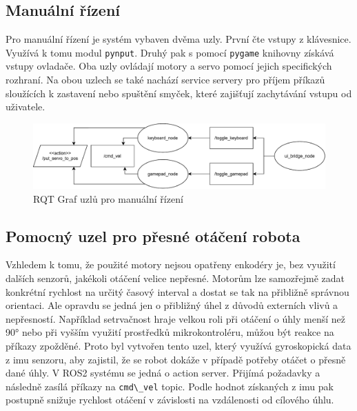\subsection*{Manuální řízení}
Pro manuální řízení je systém vybaven dvěma uzly. První čte vstupy z klávesnice. Využívá k tomu modul \verb|pynput|. Druhý pak s pomocí \verb|pygame| knihovny získává vstupy ovladače. Oba uzly ovládají motory a servo pomocí jejich specifických rozhraní. Na obou uzlech se také nachází service servery pro příjem příkazů sloužících k zastavení nebo spuštění smyček, které zajišťují zachytávání vstupu od uživatele.

\begin{figure}[h!]
	\centering
	\includegraphics[scale=0.75]{obrazky-figures/manual_control_diagram.pdf}
	\caption{RQT Graf uzlů pro manuální řízení}
	\label{}
\end{figure}

\subsection*{Pomocný uzel pro přesné otáčení robota}
Vzhledem k tomu, že použité motory nejsou opatřeny enkodéry je, bez využití dalších senzorů, jakékoli otáčení velice nepřesné. Motorům lze samozřejmě zadat konkrétní rychlost na určitý časový interval a dostat se tak na přibližně správnou orientaci. Ale opravdu se jedná jen o přibližný úhel z důvodů externích vlivů a nepřesností. Například setrvačnost hraje velkou roli při otáčení o úhly menší než 90° nebo při vyšším využití prostředků mikrokontroléru, můžou být reakce na příkazy zpožděné.
Proto byl vytvořen tento uzel, který využívá gyroskopická data z imu senzoru, aby zajistil, že se robot dokáže v případě potřeby otáčet o přesně dané úhly. V ROS2 systému se jedná o action server. Přijímá požadavky a následně zasílá příkazy na \verb|cmd\_vel| topic. Podle hodnot získaných z imu pak postupně snižuje rychlost otáčení v závislosti na vzdálenosti od cílového úhlu. 

